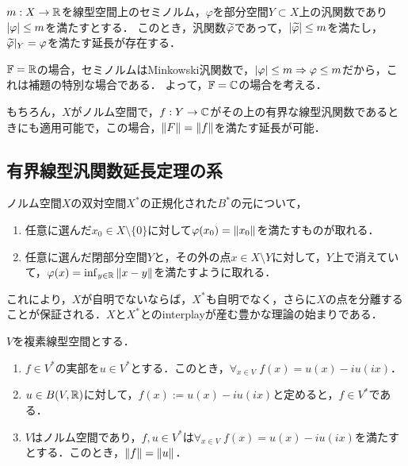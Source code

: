 \documentclass[uplatex,dvipdfmx]{jsreport}
\begin{document}
\begin{theorem}
    $m:X\to\mathbb{R}$を線型空間上のセミノルム，$\varphi$を部分空間$Y\subset X$上の汎関数であり$\lvert\varphi\rvert\le m$を満たすとする．
    このとき，汎関数$\widetilde{\varphi}$であって，$\lvert\widetilde{\varphi}\rvert\le m$を満たし，$\widetilde{\varphi}|_Y=\varphi$を満たす延長が存在する．
\end{theorem}
\begin{Proof}
    $\mathbb{F}=\mathbb{R}$の場合，セミノルムはMinkowski汎関数で，$\lvert\varphi\rvert\le m\Rightarrow\varphi\le m$だから，これは補題の特別な場合である．
    よって，$\mathbb{F}=\mathbb{C}$の場合を考える．
\end{Proof}
\begin{remarks}
    もちろん，$X$がノルム空間で，$f:Y\to\mathbb{C}$がその上の有界な線型汎関数であるときにも適用可能で，この場合，$\|F\|=\|f\|$を満たす延長が可能．
\end{remarks}

\subsection{有界線型汎関数延長定理の系}

\begin{tcolorbox}[colframe=ForestGreen, colback=ForestGreen!10!white,breakable,colbacktitle=ForestGreen!40!white,coltitle=black,fonttitle=\bfseries\sffamily,
title=]
    ノルム空間$X$の双対空間$X^*$の正規化された$B^*$の元について，
    \begin{enumerate}
        \item 任意に選んだ$x_0\in X\setminus\{0\}$に対して$\varphi(x_0)=\|x_0\|$を満たすものが取れる．
        \item 任意に選んだ閉部分空間$Y$と，その外の点$x\in X\setminus Y$に対して，$Y$上で消えていて，$\varphi(x)=\inf_{y\in\mathbb{R}}\|x-y\|$を満たすように取れる．
    \end{enumerate}
    これにより，$X$が自明でないならば，$X^*$も自明でなく，さらに$X$の点を分離することが保証される．$X$と$X^*$とのinterplayが産む豊かな理論の始まりである．
\end{tcolorbox}

\begin{proposition}[複素線型空間は実線形空間]
    $V$を複素線型空間とする．
    \begin{enumerate}
        \item $f\in V^*$の実部を$u\in V^*$とする．このとき，$\forall_{x\in V}\;f(x)=u(x)-iu(ix)$．
        \item $u\in B(V,\mathbb{R})$に対して，$f(x):=u(x)-iu(ix)$と定めると，$f\in V^*$である．
        \item $V$はノルム空間であり，$f,u\in V^*$は$\forall_{x\in V}\;f(x)=u(x)-iu(ix)$を満たすとする．このとき，$\|f\|=\|u\|$．
    \end{enumerate}
\end{proposition}
\end{document}
